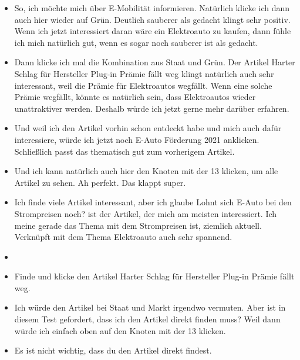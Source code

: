 {\begin{itemize}[]
                  Was mir hier aber fehlt ist, dass die Sätze wieder im Text angezeigt werden.
            \item {} So, ich möchte mich über E-Mobilität informieren.
                  Natürlich klicke ich dann auch hier wieder auf Grün.
                  \flqq Deutlich sauberer als gedacht\frqq{} klingt sehr positiv.
                  Wenn ich jetzt interessiert daran wäre ein Elektroauto zu kaufen, dann fühle ich mich natürlich gut, wenn es sogar noch sauberer ist als gedacht.
            \item {} Dann klicke ich mal die Kombination aus Staat und Grün.
                  Der Artikel \flqq Harter Schlag für Hersteller Plug-in Prämie fällt weg\frqq{} klingt natürlich auch sehr interessant, weil die Prämie für Elektroautos wegfällt.
                  Wenn eine solche Prämie wegfällt, könnte es natürlich sein, dass Elektroautos wieder unattraktiver werden.
                  Deshalb würde ich jetzt gerne mehr darüber erfahren.
            \item {} Und weil ich den Artikel vorhin schon entdeckt habe und mich auch dafür interessiere, würde ich jetzt noch \flqq E-Auto Förderung 2021\frqq{} anklicken.
                  Schließlich passt das thematisch gut zum vorherigem Artikel.
            \item {} Und ich kann natürlich auch hier den Knoten mit der 13 klicken, um alle Artikel zu sehen.
                  Ah perfekt. Das klappt super.
            \item {} Ich finde viele Artikel interessant, aber ich glaube \flqq Lohnt sich E-Auto bei den Strompreisen noch?\frqq{} ist der Artikel, der mich am meisten interessiert.
                  Ich meine gerade das Thema mit dem Strompreisen ist, ziemlich aktuell.
                  Verknüpft mit dem Thema Elektroauto auch sehr spannend.
            \item {}
            \item {} Finde und klicke den Artikel \flqq Harter Schlag für Hersteller Plug-in Prämie fällt weg\frqq{}.
            \item {} Ich würde den Artikel bei Staat und Markt irgendwo vermuten.
                  Aber ist in diesem Test gefordert, dass ich den Artikel direkt finden muss?
                  Weil dann würde ich einfach oben auf den Knoten mit der 13 klicken.
            \item {} Es ist nicht wichtig, dass du den Artikel direkt findest.

\end{itemize}}
